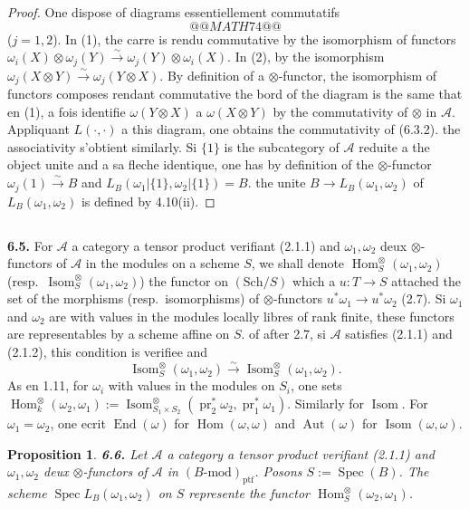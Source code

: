 \documentclass[12pt,a4paper]{article}
\theoremstyle{plain}
\newtheorem{proposition}[theorem]{Proposition}
\theoremstyle{definition}
\theoremstyle{remark}
\DeclareMathOperator{\Hom}{Hom}
\DeclareMathOperator{\End}{End}
\DeclareMathOperator{\Aut}{Aut}
\DeclareMathOperator{\Isom}{Isom}
\DeclareMathOperator{\Spec}{Spec}
\DeclareMathOperator{\pr}{pr}
\begin{document}
\begin{proof}
One dispose of diagrams essentiellement commutatifs
\[
@@MATH74@@
\]
($j = 1,2$). In (1), the carre is rendu commutative by the isomorphism of functors $\omega_i(X) \otimes \omega_j(Y) \xrightarrow{\sim} \omega_j(Y) \otimes \omega_i(X)$. In (2), by the isomorphism $\omega_j(X \otimes Y) \xrightarrow{\sim} \omega_j(Y \otimes X)$. By definition of a $\otimes$-functor, the isomorphism of functors composes rendant commutative the bord of the diagram is the same that en (1), a fois identifie $\omega(Y \otimes X)$ a $\omega(X \otimes Y)$ by the commutativity of $\otimes$ in $\mathcal{A}$. Appliquant $L(\cdot,\cdot)$ a this diagram, one obtains the commutativity of (6.3.2). the associativity s'obtient similarly. Si $\{1\}$ is the subcategory of $\mathcal{A}$ reduite a the object unite and a sa fleche identique, one has by definition of the $\otimes$-functor $\omega_j(1) \xrightarrow{\sim} B$ and $L_B(\omega_1|\{1\}, \omega_2|\{1\}) = B$. the unite $B \to L_B(\omega_1,\omega_2)$ of $L_B(\omega_1,\omega_2)$ is defined by 4.10(ii).
\end{proof}

\subsection{}

\textbf{6.5.} For $\mathcal{A}$ a category a tensor product verifiant (2.1.1) and $\omega_1, \omega_2$ deux $\otimes$-functors of $\mathcal{A}$ in the modules on a scheme $S$, we shall denote $\Hom^\otimes_S(\omega_1,\omega_2)$ (resp.~$\Isom^\otimes_S(\omega_1,\omega_2)$) the functor on $(\mathrm{Sch}/S)$ which a $u : T \to S$ attached the set of the morphisms (resp.~isomorphisms) of $\otimes$-functors $u^*\omega_1 \to u^*\omega_2$ (2.7). Si $\omega_1$ and $\omega_2$ are with values in the modules locally libres of rank finite, these functors are representables by a scheme affine on $S$. of after 2.7, si $\mathcal{A}$ satisfies (2.1.1) and (2.1.2), this condition is verifiee and
\[
\Isom^\otimes_S(\omega_1,\omega_2) \xrightarrow{\sim} \Isom^\otimes_S(\omega_1,\omega_2).
\]
As en 1.11, for $\omega_i$ with values in the modules on $S_i$, one sets $\Hom^\otimes_k(\omega_2,\omega_1) := \Isom^\otimes_{S_1 \times S_2}(\pr_2^*\omega_2, \pr_1^*\omega_1)$. Similarly for $\Isom$. For $\omega_1 = \omega_2$, one ecrit $\End(\omega)$ for $\Hom(\omega,\omega)$ and $\Aut(\omega)$ for $\Isom(\omega,\omega)$.

\begin{proposition}\label{prop:6.6}
\textbf{6.6.} Let $\mathcal{A}$ a category a tensor product verifiant (2.1.1) and $\omega_1, \omega_2$ deux $\otimes$-functors of $\mathcal{A}$ in $(B\text{-mod})_\mathrm{ptf}$. Posons $S := \Spec(B)$. The scheme $\Spec L_B(\omega_1,\omega_2)$ on $S$ represente the functor $\Hom^\otimes_S(\omega_2,\omega_1)$.
\end{proposition}
\end{document}
